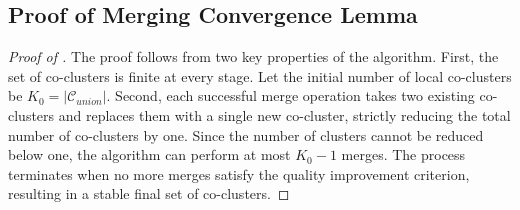 \documentclass[journal]{IEEEtran}
\theoremstyle{definition}
\theoremstyle{remark} %
\begin{document}
\subsection{Proof of Merging Convergence Lemma}
\label{appendix:proof-merging-convergence}

\begin{proof}[Proof of ]
    The proof follows from two key properties of the algorithm. First, the set of co-clusters is finite at every stage. Let the initial number of local co-clusters be $K_0 = |\mathcal{C}_{union}|$. Second, each successful merge operation takes two existing co-clusters and replaces them with a single new co-cluster, strictly reducing the total number of co-clusters by one. Since the number of clusters cannot be reduced below one, the algorithm can perform at most $K_0 - 1$ merges. The process terminates when no more merges satisfy the quality improvement criterion, resulting in a stable final set of co-clusters.
\end{proof}
\end{document}
